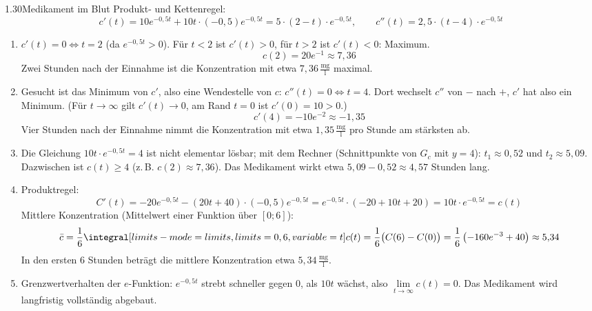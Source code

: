 \begin{loesung}{1.30}{Medikament im Blut}
Produkt- und Kettenregel:
\[c'(t) = 10e^{-0{,}5t}+10t\cdot(-0{,}5)e^{-0{,}5t} = 5\cdot(2-t)\cdot e^{-0{,}5t},\qquad c''(t) = 2{,}5\cdot(t-4)\cdot e^{-0{,}5t}\]
\begin{enumerate}[label=\alph*)]
  \item $c'(t)=0\Longleftrightarrow t=2$ (da $e^{-0{,}5t}>0$). Für $t<2$ ist $c'(t)>0$, für $t>2$ ist $c'(t)<0$: Maximum.
  \[c(2) = 20e^{-1}\approx 7{,}36\]
  Zwei Stunden nach der Einnahme ist die Konzentration mit etwa $7{,}36\,\frac{\text{mg}}{\text{l}}$ maximal.
  \item Gesucht ist das Minimum von $c'$, also eine Wendestelle von $c$: $c''(t)=0\Longleftrightarrow t=4$. Dort wechselt $c''$ von $-$ nach $+$, $c'$ hat also ein Minimum. (Für $t\longrightarrow\infty$ gilt $c'(t)\longrightarrow 0$, am Rand $t=0$ ist $c'(0)=10>0$.)
  \[c'(4) = -10e^{-2}\approx-1{,}35\]
  Vier Stunden nach der Einnahme nimmt die Konzentration mit etwa $1{,}35\,\frac{\text{mg}}{\text{l}}$ pro Stunde am stärksten ab.
  \item Die Gleichung $10t\cdot e^{-0{,}5t} = 4$ ist nicht elementar lösbar; mit dem Rechner (Schnittpunkte von $G_c$ mit $y=4$): $t_1\approx 0{,}52$ und $t_2\approx 5{,}09$. Dazwischen ist $c(t)\geq 4$ (z.\,B. $c(2)\approx 7{,}36$). Das Medikament wirkt etwa $5{,}09-0{,}52\approx 4{,}57$ Stunden lang.
  \item Produktregel:
  \[C'(t) = -20e^{-0{,}5t}-(20t+40)\cdot(-0{,}5)e^{-0{,}5t} = e^{-0{,}5t}\cdot(-20+10t+20) = 10t\cdot e^{-0{,}5t} = c(t)\]
  Mittlere Konzentration (Mittelwert einer Funktion über $[0;6]$):
  \[\bar{c} = \dfrac{1}{6}\integral[limits-mode=limits,limits={0, 6}, variable={t}]{c(t)} = \dfrac{1}{6}\big(C(6)-C(0)\big) = \dfrac{1}{6}\left(-160e^{-3}+40\right)\approx 5{,}34\]
  In den ersten $6$ Stunden beträgt die mittlere Konzentration etwa $5{,}34\,\frac{\text{mg}}{\text{l}}$.
  \item Grenzwertverhalten der $e$-Funktion: $e^{-0{,}5t}$ strebt schneller gegen $0$, als $10t$ wächst, also $\lim\limits_{t\longrightarrow\infty}c(t) = 0$. Das Medikament wird langfristig vollständig abgebaut.
\end{enumerate}
\end{loesung}

